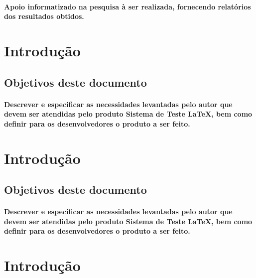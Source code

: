 \documentclass{article}
\begin{document}
			\paragraph{Apoio informatizado na pesquisa à ser realizada, fornecendo relatórios dos resultados obtidos.}

			
\newpage

\section{Introdução}
	\subsection{Objetivos deste documento}
		\paragraph{Descrever e especificar as necessidades levantadas pelo autor que devem ser atendidas pelo produto Sistema de Teste LaTeX, bem como definir para os desenvolvedores o produto a ser feito.}


\newpage

\section{Introdução}
	\subsection{Objetivos deste documento}
		\paragraph{Descrever e especificar as necessidades levantadas pelo autor que devem ser atendidas pelo produto Sistema de Teste LaTeX, bem como definir para os desenvolvedores o produto a ser feito.}


\newpage

\section{Introdução}
\end{document}
